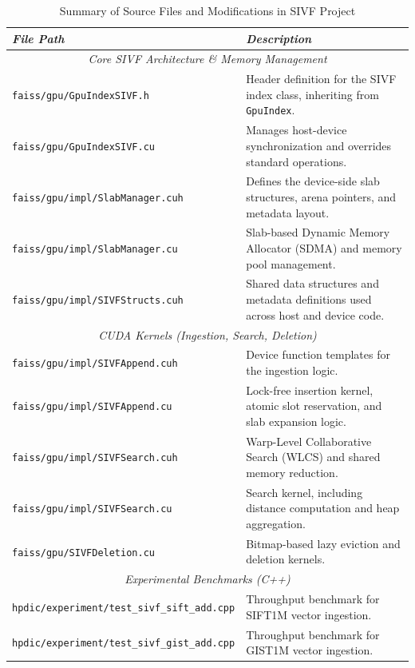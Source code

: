 \documentclass[sigconf,nonacm]{acmart}
\theoremstyle{plain}
\theoremstyle{definition}
\theoremstyle{remark}
\begin{document}
\begin{table}[t]
    \centering
    \caption{Summary of Source Files and Modifications in SIVF Project}
    \label{tab:file_structure}
    \begin{tabular}{l|p{10.5cm}}
    \hline
    \textit{File Path} & \textit{Description} \\
    \hline
    \multicolumn{2}{c}{\textit{Core SIVF Architecture \& Memory Management}} \\
    \hline
    \texttt{faiss/gpu/GpuIndexSIVF.h} & Header definition for the SIVF index class, inheriting from \texttt{GpuIndex}. \\
    \texttt{faiss/gpu/GpuIndexSIVF.cu} & Manages host-device synchronization and overrides standard operations. \\
    \texttt{faiss/gpu/impl/SlabManager.cuh} & Defines the device-side slab structures, arena pointers, and metadata layout. \\
    \texttt{faiss/gpu/impl/SlabManager.cu} & Slab-based Dynamic Memory Allocator (SDMA) and memory pool management. \\
    \texttt{faiss/gpu/impl/SIVFStructs.cuh} & Shared data structures and metadata definitions used across host and device code. \\
    \hline
    \multicolumn{2}{c}{\textit{CUDA Kernels (Ingestion, Search, Deletion)}} \\
    \hline
    \texttt{faiss/gpu/impl/SIVFAppend.cuh} & Device function templates for the ingestion logic. \\
    \texttt{faiss/gpu/impl/SIVFAppend.cu} & Lock-free insertion kernel, atomic slot reservation, and slab expansion logic. \\
    \texttt{faiss/gpu/impl/SIVFSearch.cuh} & Warp-Level Collaborative Search (WLCS) and shared memory reduction. \\
    \texttt{faiss/gpu/impl/SIVFSearch.cu} & Search kernel, including distance computation and heap aggregation. \\
    \texttt{faiss/gpu/SIVFDeletion.cu} & Bitmap-based lazy eviction and deletion kernels. \\
    \hline
    \multicolumn{2}{c}{\textit{Experimental Benchmarks (C++)}} \\
    \hline
    \texttt{hpdic/experiment/test\_sivf\_sift\_add.cpp} & Throughput benchmark for SIFT1M vector ingestion. \\
    \texttt{hpdic/experiment/test\_sivf\_gist\_add.cpp} & Throughput benchmark for GIST1M vector ingestion. \\

\end{tabular}
\end{table}
\end{document}
